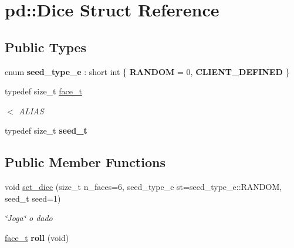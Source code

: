 \hypertarget{structpd_1_1Dice}{}\section{pd\+:\+:Dice Struct Reference}
\label{structpd_1_1Dice}
\subsection*{Public Types}
\begin{DoxyCompactItemize}
\item 
\mbox{\label{structpd_1_1Dice_a341b549359c5757352481bbfba56b1b3}} 
enum {\bfseries seed\+\_\+type\+\_\+e} \+: short int \{ {\bfseries R\+A\+N\+D\+OM} = 0, 
{\bfseries C\+L\+I\+E\+N\+T\+\_\+\+D\+E\+F\+I\+N\+ED}
 \}
\item 
\mbox{\label{structpd_1_1Dice_ace51e9e55fc4fbf9af1872981bdaaa14}} 
typedef size\+\_\+t \hyperlink{structpd_1_1Dice_ace51e9e55fc4fbf9af1872981bdaaa14}{face\+\_\+t}
\begin{DoxyCompactList}\small\item\em $<$ A\+L\+I\+AS \end{DoxyCompactList}\item 
\mbox{\label{structpd_1_1Dice_adf7b3058b5000a878a5c01200bfe3a04}} 
typedef size\+\_\+t {\bfseries seed\+\_\+t}
\end{DoxyCompactItemize}
\subsection*{Public Member Functions}
\begin{DoxyCompactItemize}
\item 
void \hyperlink{structpd_1_1Dice_a92e8fb97036501a707952d377d682e70}{set\+\_\+dice} (size\+\_\+t n\+\_\+faces=6, seed\+\_\+type\+\_\+e st=seed\+\_\+type\+\_\+e\+::\+R\+A\+N\+D\+OM, seed\+\_\+t seed=1)
\begin{DoxyCompactList}\small\item\em \char`\"{}\+Joga\char`\"{} o dado \end{DoxyCompactList}\item 
\mbox{\label{structpd_1_1Dice_a3680c2f25a57455526d2d01e51e5bc95}} 
\hyperlink{structpd_1_1Dice_ace51e9e55fc4fbf9af1872981bdaaa14}{face\+\_\+t} {\bfseries roll} (void)
\end{DoxyCompactItemize}
